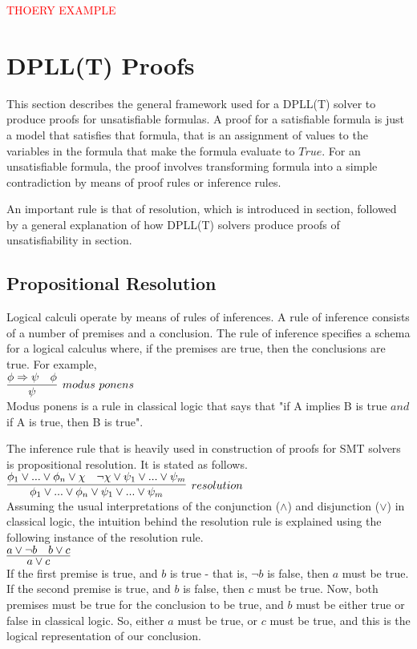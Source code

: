 \documentclass{report}
\begin{document}
\textcolor{red}{THOERY EXAMPLE}

\section{DPLL(T) Proofs}
\label{sec:proofs}
This section describes the general framework used for a 
DPLL(T) solver to produce proofs for unsatisfiable formulas. 
A proof for a satisfiable formula is just a model that 
satisfies that formula, that is an assignment of values to 
the variables in the formula that make the formula evaluate 
to $True$. For an unsatisfiable formula, the proof involves 
transforming formula into a simple contradiction by means 
of proof rules or inference rules. 

An important rule is that of resolution, which is introduced 
in section, followed by a general explanation of how DPLL(T) 
solvers produce proofs of unsatisfiability in section.

\subsection{Propositional Resolution}
\label{sec:res}
Logical calculi operate by means of rules of inferences. A
rule of inference consists of a number of premises and a 
conclusion. The rule of inference specifies a schema for a 
logical calculus where, if the premises are true, then 
the conclusions are true. For example, \\
$\infer[modus\ ponens]{\psi}{\phi \Rightarrow \psi & \phi}$ \\
Modus ponens is a rule in classical logic that says that 
"if A implies B is true $and$ if A is true, then B is true".

The inference rule that is heavily used in construction of 
proofs for SMT solvers is propositional resolution. It is
stated as follows. \\
$\infer[resolution]{\phi_1 \lor ... \lor \phi_n \lor \psi_1 \lor ... \lor \psi_m}
{\phi_1 \lor ... \lor \phi_n \lor \chi & \neg \chi \lor \psi_1 \lor ... \lor \psi_m}$ \\

Assuming the usual interpretations of the conjunction
($\land$) and disjunction ($\lor$) in classical logic, the 
intuition behind the resolution rule is explained using the 
following instance of the resolution rule. \\
$\infer{a \lor c}{a \lor \neg b & b \lor c}$ \\
If the first premise is true, and $b$ is true - that is, 
$\neg b$ is false, then $a$ must be true. If the second 
premise is true, and $b$ is false, then $c$ must be true.
Now, both premises must be true for the conclusion to be true, 
and $b$ must be either true or false in classical logic. 
So, either $a$ must be true, or $c$ must be true, and this 
is the logical representation of our conclusion.
\end{document}
